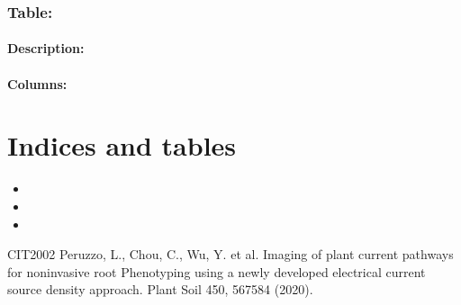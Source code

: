 \documentclass[letterpaper,10pt,english]{sphinxmanual}
\begin{document}
\subsection{Table: }
\label{\detokenize{schema_documentation:table-sampling}}\label{\detokenize{schema_documentation:section-1}}

\subsubsection{Description:}
\label{\detokenize{schema_documentation:description-5}}\label{\detokenize{schema_documentation:id26}}

\subsubsection{Columns:}
\label{\detokenize{schema_documentation:columns-6}}\label{\detokenize{schema_documentation:id27}}\label{\detokenize{schema_documentation:section-2}}

\chapter{Indices and tables}
\label{\detokenize{index:indices-and-tables}}\begin{itemize}
\item {} 

\item {} 

\item {} 

\end{itemize}

\begin{sphinxthebibliography}{CIT2002}
Peruzzo, L., Chou, C., Wu, Y. et al. Imaging of plant current pathways for non\sphinxhyphen{}invasive root Phenotyping using a newly developed electrical current source density approach. Plant Soil 450, 567\textendash{}584 (2020). 
\end{sphinxthebibliography}



\renewcommand{\indexname}{Index}
\printindex
\end{document}
